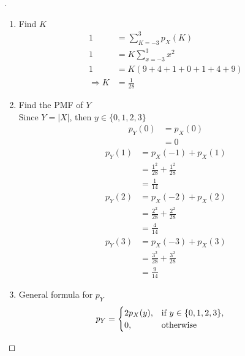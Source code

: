 \documentclass[paper=usletter, fontsize=12pt]{article}
\begin{document}
\begin{enumerate}
\begin{proof}[\unskip\nopunct]
            \begin{enumerate}

                \item Find $K$
                \begin{align*}
                    1 & = \sum_{K = -3}^{3} p_X(K)\\
                    1 & = K\sum_{x = -3}^{3} x^2\\
                    1 & = K(9 + 4 + 1 + 0 + 1 + 4 + 9) \\
                    \Rightarrow K & = \frac{1}{28}
                \end{align*}

                \item Find the PMF of $Y$\\
                Since $Y = |X|$, then $y \in \{0,1,2,3\}$\\
                \begingroup
                \addtolength{\jot}{1em}
                \begin{align*}
                    p_Y(0) & = p_X(0)\\
                    & = 0
                \end{align*}
                \begin{align*}
                    p_Y(1) & = p_X(-1) + p_X(1)\\
                    & = \frac{1^2}{28} + \frac{1^2}{28}\\
                    & = \frac{1}{14}
                \end{align*}
                \begin{align*}
                    p_Y(2) & = p_X(-2) + p_X(2)\\
                    & = \frac{2^2}{28} + \frac{2^2}{28}\\
                    & = \frac{4}{14}
                \end{align*}
                \begin{align*}
                    p_Y(3) & = p_X(-3) + p_X(3)\\
                    & = \frac{3^2}{28} + \frac{3^2}{28}\\
                    & = \frac{9}{14}
                \end{align*}
                \endgroup

                \item General formula for $p_Y$
                \begin{align*}
                    p_Y & =
                    \begin{cases}
                        2p_X(y), & \text{if}\ y \in \{0,1,2,3\},\\
                        0, & \text{otherwise}
                    \end{cases} \qedhere
                \end{align*}


\end{enumerate}
\end{proof}
\end{enumerate}
\end{document}
